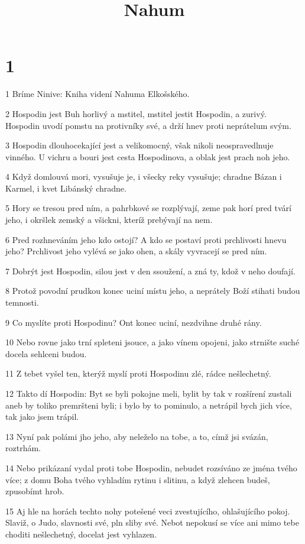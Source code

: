 

\title{Nahum}

\chapter{1}

\par 1 Bríme Ninive: Kniha videní Nahuma Elkošského.
\par 2 Hospodin jest Buh horlivý a mstitel, mstitel jestit Hospodin, a zurivý. Hospodin uvodí pomstu na protivníky své, a drží hnev proti neprátelum svým.
\par 3 Hospodin dlouhocekající jest a velikomocný, však nikoli neospravedlnuje vinného. U vichru a bouri jest cesta Hospodinova, a oblak jest prach noh jeho.
\par 4 Když domlouvá mori, vysušuje je, i všecky reky vysušuje; chradne Bázan i Karmel, i kvet Libánský chradne.
\par 5 Hory se tresou pred ním, a pahrbkové se rozplývají, zeme pak horí pred tvárí jeho, i okršlek zemský a všickni, kteríž prebývají na nem.
\par 6 Pred rozhneváním jeho kdo ostojí? A kdo se postaví proti prchlivosti hnevu jeho? Prchlivost jeho vylévá se jako ohen, a skály vyvracejí se pred ním.
\par 7 Dobrýt jest Hospodin, silou jest v den ssoužení, a zná ty, kdož v neho doufají.
\par 8 Protož povodní prudkou konec uciní místu jeho, a neprátely Boží stihati budou temnosti.
\par 9 Co myslíte proti Hospodinu? Ont konec uciní, nezdvihne druhé rány.
\par 10 Nebo rovne jako trní spleteni jsouce, a jako vínem opojeni, jako strnište suché docela sehlceni budou.
\par 11 Z tebet vyšel ten, kterýž myslí proti Hospodinu zlé, rádce nešlechetný.
\par 12 Takto dí Hospodin: Byt se byli pokojne meli, bylit by tak v rozšírení zustali aneb by toliko premršteni byli; i bylo by to pominulo, a netrápil bych jich více, tak jako jsem trápil.
\par 13 Nyní pak polámi jho jeho, aby neleželo na tobe, a to, címž jsi svázán, roztrhám.
\par 14 Nebo prikázaní vydal proti tobe Hospodin, nebudet rozsíváno ze jména tvého více; z domu Boha tvého vyhladím rytinu i slitinu, a když zlehcen budeš, zpusobímt hrob.
\par 15 Aj hle na horách techto nohy potešené veci zvestujícího, ohlašujícího pokoj. Slaviž, o Judo, slavnosti své, pln sliby své. Nebot nepokusí se více ani mimo tebe choditi nešlechetný, docelat jest vyhlazen.

